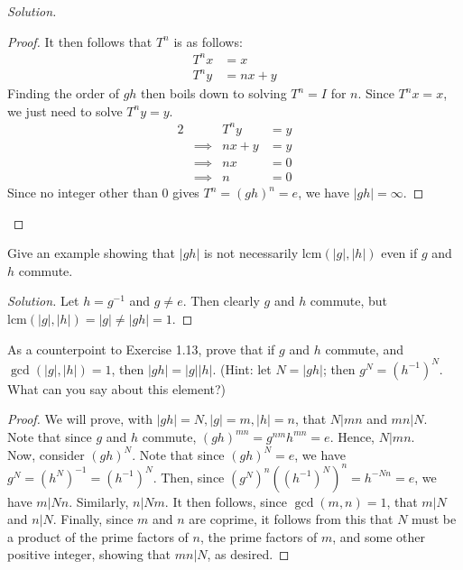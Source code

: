 \documentclass[12pt]{article}
\newenvironment{problem}[2][Problem]{\begin{trivlist}
\item[\hskip \labelsep {\bfseries #1}\hskip \labelsep {\bfseries #2.}]}{\end{trivlist}}
\newcommand{\lcm}[1]{\text{lcm}(#1)}
\newenvironment{solution}
  {\renewcommand\qedsymbol{$\blacksquare$}\begin{proof}[Solution]}
{\end{proof}}
\begin{document}
\begin{problem}{1.12}
\begin{solution}
\begin{proof}
      It then follows that $T^n$ is as follows:
      \begin{align*}
        T^nx &= x \\
        T^ny &= nx + y
      \end{align*}
      Finding the order of $gh$ then boils down to solving 
      $T^n=I$ for $n$. Since $T^nx=x$, we just need to solve 
      $T^ny=y$.
      \begin{alignat*}{2}
        & & T^ny &= y \\
        &\implies &nx + y &= y \\
        &\implies &nx &= 0 \\
        &\implies &n &= 0 
      \end{alignat*}
    Since no integer other than 0 gives $T^n=(gh)^n=e$, we have $|gh|=\infty$.
    \end{proof}
  \end{solution}
\end{problem}
\begin{problem}{1.13}
  Give an example showing that $|gh|$ is not necessarily $\lcm{|g|,|h|}$
  even if $g$ and $h$ commute.
\end{problem}
\begin{solution}
  Let $h=g^{-1}$ and $g\neq e$.
  Then clearly $g$ and $h$ commute, but\\ $\lcm{|g|,|h|}=|g|\neq|gh|=1$.
\end{solution}
\begin{problem}{1.14}
  As a counterpoint to Exercise 1.13, prove that if $g$ and $h$ commute, and $\gcd(|g|,|h|)=1$, then
  $|gh|=|g||h|$. (Hint: let $N=|gh|$; then $g^N = (h^{-1})^N$. What can you say about this element?)
\end{problem}
\begin{proof}
  We will prove, with $|gh|=N, |g|=m, |h|=n$, that $N|mn$ and $mn|N$.\\
  Note that since $g$ and $h$ commute, $(gh)^{mn} = g^{nm}h^{mn} = e$. Hence, $N | mn$.\\
  Now, consider $(gh)^N$. Note that since $(gh)^N=e$, we have $g^N=(h^N)^{-1}=(h^{-1})^N$.
  Then, since $(g^N)^n\left( (h^{-1})^N \right)^n = h^{-Nn}=e$, we have $m|Nn$. Similarly, $n|Nm$.
  It then follows, since $\gcd(m, n) = 1$, that $m|N$ and $n|N$. 
  Finally, since $m$ and $n$ are coprime, it follows from this that $N$ must be a product of the prime factors
  of $n$, the prime factors of $m$, and some other positive integer, showing that $mn | N$, as desired.
\end{proof}
\end{document}
